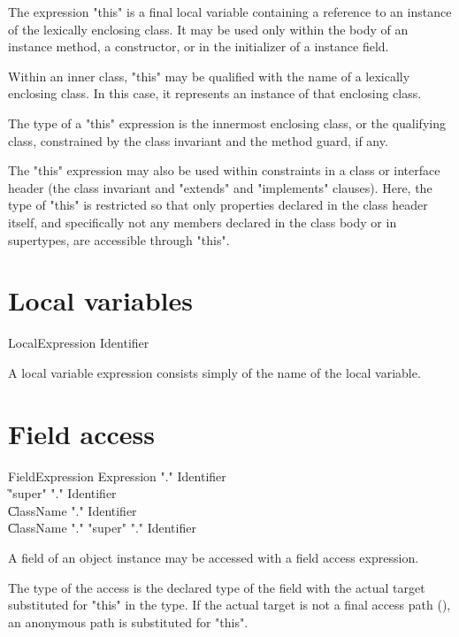 The expression \xcd"this" is a final local variable containing a reference
to an instance of the lexically enclosing class.
It may be used only within the body of an instance method, a
constructor, or in the initializer of a instance field.

Within an inner class, \xcd"this" may be qualified with the
name of a lexically enclosing class.  In this case, it
represents an instance of that enclosing class.

The type of a \xcd"this" expression is the
innermost enclosing class, or the qualifying class,
constrained by the class invariant and the
method guard, if any.

The \xcd"this" expression may also be used within constraints in
a class or interface header (the class invariant and
\xcd"extends" and \xcd"implements" clauses).  Here, the type of
\xcd"this" is restricted so that only properties declared in the
class header itself, and specifically not any members declared in the class
body or in supertypes, are accessible through \xcd"this".

\section{Local variables}


\begin{grammar}
LocalExpression \: Identifier \\
\end{grammar}

A local variable expression consists simply of the name of the
local variable.


\section{Field access}
\label{FieldAccess}


\begin{grammar}
FieldExpression \: Expression \xcd"." Identifier \\
                \| \xcd"super" \xcd"." Identifier \\
                \| ClassName \xcd"." Identifier \\
                \| ClassName \xcd"." \xcd"super" \xcd"." Identifier \\
\end{grammar}

A field of an object instance may be  accessed
with a field access expression.

The type of the access is the declared type of the field with the
actual target substituted for \xcd"this" in the type.  If the actual
target is not a final access path (),
an anonymous path is substituted for \xcd"this".

